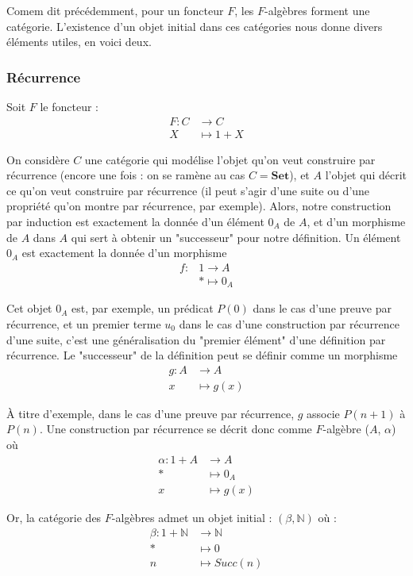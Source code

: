 \documentclass{article}
\newcommand{\N}{\mathbb{N}}
\begin{document}
Comem dit précédemment, pour un foncteur $F$, les $F$-algèbres forment une catégorie. L'existence d'un objet initial dans ces catégories nous donne divers éléments utiles, en voici deux. 

\subsubsection{Récurrence}

Soit $F$ le foncteur : 
\begin{align*}
    F : C & \rightarrow C \\ 
    X & \mapsto 1 + X
\end{align*}

On considère $C$ une catégorie qui modélise l'objet qu'on veut construire par récurrence (encore une fois : on se ramène au cas $C = \mathbf{Set}$), et $A$ l'objet qui décrit ce qu'on veut construire par récurrence (il peut s'agir d'une suite ou d'une propriété qu'on montre par récurrence, par exemple). Alors, notre construction par induction est exactement la donnée d'un élément $0_A$ de $A$, et d'un morphisme de $A$ dans $A$ qui sert à obtenir un "successeur" pour notre définition. Un élément $0_A$ est exactement la donnée d'un morphisme  
\begin{align*}
f : & 1  \rightarrow A \\
    & * \mapsto 0_A
\end{align*}

 Cet objet $0_A$ est, par exemple, un prédicat $P(0)$ dans le cas d'une preuve par récurrence, et un premier terme $u_0$ dans le cas d'une construction par récurrence d'une suite, c'est une généralisation du "premier élément" d'une définition par récurrence. Le "successeur" de la définition peut se définir comme un morphisme 
\begin{align*}
    g : A &  \rightarrow A \\ 
        x & \mapsto g(x)
\end{align*}

À titre d'exemple, dans le cas d'une preuve par récurrence, $g$ associe $P(n+1)$ à $P(n)$.
   Une construction par récurrence se décrit donc comme $F$-algèbre ($A$, $\alpha$) où
\begin{align*}
    \alpha : 1 + A & \rightarrow A \\ 
    * & \mapsto 0_A \\ 
    x & \mapsto g(x)
\end{align*}

Or, la catégorie des $F$-algèbres admet un objet initial : $(\beta, \N)$ où : 
\begin{align*}
\beta : 1 + \N & \rightarrow \N \\
        * & \mapsto 0 \\ 
        n & \mapsto Succ(n)
\end{align*}
\end{document}
